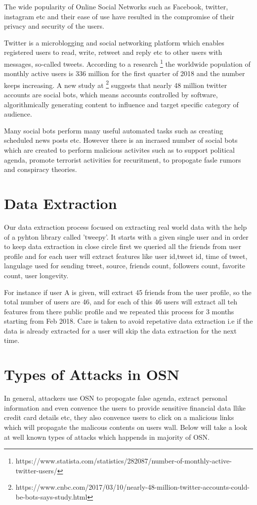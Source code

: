 \documentclass[conference]{IEEEtran}
\begin{document}
The wide popularity of Online Social Networks such as Facebook, twitter, instagram etc and their ease of use have resulted in the compromise of their privacy and security of the users. 

Twitter is a microblogging and social networking  platform which enables registered users to read, write, retweet and reply etc to other users with messages, so-called tweets.
According to a research \footnote{https://www.statista.com/statistics/282087/number-of-monthly-active-twitter-users/} the worldwide population of monthly active users is 336 million for the first quarter of 2018 and the number keeps increasing. A new study at \footnote{https://www.cnbc.com/2017/03/10/nearly-48-million-twitter-accounts-could-be-bots-says-study.html} suggests 
that nearly 48 million twitter accounts are social bots, which means accounts controlled by software, algorithmically generating content to influence and target specific category of audience.

Many social bots perform many useful automated tasks such as creating scheduled news posts etc. However there is an incrased number of social bots which are created to perform malicious activites such as to support political agenda, promote terrorist activities for recuritment, to propogate fasle rumors and conspiracy theories. 

\section{Data Extraction}

Our data extraction process focused on extracting real world data with the help of a pyhton library called 'tweepy'. It starts with a given single user and in order to keep data extraction in close circle first we queried all the friends from user profile and for each user will extract features like user id,tweet id, time of tweet, langulage used for sending tweet, source, friends count, followers count, favorite count, user longevity.

For instance if user A is given, will extract 45 friends from the user profile, so the total number of users are 46, and for each of this 46 users will extract all teh features from there public profile and we repeated this process for 3 months starting from Feb 2018. Care is taken to avoid repetative data extraction i.e if the data is already extracted for a user will skip the data extraction for the next time.

\section{Types of Attacks in OSN}
In general, attackers use OSN to propogate false agenda, extract personal information and even convence the users to provide sensitive financial data llike credit card details etc, they also convence users to click on a malicious links which will propagate the malicous contents on users wall. Below will take a look at well known types of attacks which happends in majority of OSN.
\end{document}
